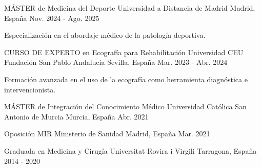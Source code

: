 

\begin{cventries}

  \cventry
    {MÁSTER de Medicina del Deporte} %
    {Universidad a Distancia de Madrid} %
    {Madrid, España} %
    {Nov. 2024 - Ago. 2025} %
    {
      \begin{cvitems} %
        \item {Especialización en el abordaje médico de la patología deportiva.}
      \end{cvitems}
    }

  \cventry
    {CURSO DE EXPERTO en Ecografía para Rehabilitación} %
    {Universidad CEU Fundación San Pablo Andalucía} %
    {Sevilla, España} %
    {Mar. 2023 - Abr. 2024} %
    {
      \begin{cvitems} %
        \item {Formación avanzada en el uso de la ecografía como herramienta diagnóstica e intervencionista.}
      \end{cvitems}
    }

  \cventry
    {MÁSTER de Integración del Conocimiento Médico} %
    {Universidad Católica San Antonio de Murcia} %
    {Murcia, España} %
    {Abr. 2021} %
    {}

  \cventry
    {Oposición MIR} %
    {Ministerio de Sanidad} %
    {Madrid, España} %
    {Mar. 2021} %
    {}

  \cventry
    {Graduada en Medicina y Cirugía} %
    {Universitat Rovira i Virgili} %
    {Tarragona, España} %
    {2014 - 2020} %
    {}

\end{cventries}
